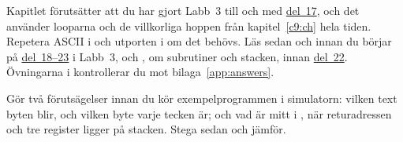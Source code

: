 Kapitlet förutsätter att du har gjort Labb~3 till och med \hyperref[lab3:d17]{del~17}, och det
använder looparna och de villkorliga hoppen från kapitel~\ref{c9:ch} hela tiden. Repetera ASCII i
 och utporten i  om det behövs. Läs sedan  och
 innan du börjar på \hyperref[lab3:d18]{del~18--23} i Labb~3, och
, om subrutiner och stacken, innan \hyperref[lab3:d22]{del~22}. Övningarna i
 kontrollerar du mot bilaga~\ref{app:answers}.

Gör två förutsägelser innan du kör exempelprogrammen i simulatorn: vilken text byten 
blir, och vilken byte varje tecken är; och vad  är mitt i , när
returadressen och tre register ligger på stacken. Stega sedan och jämför.






